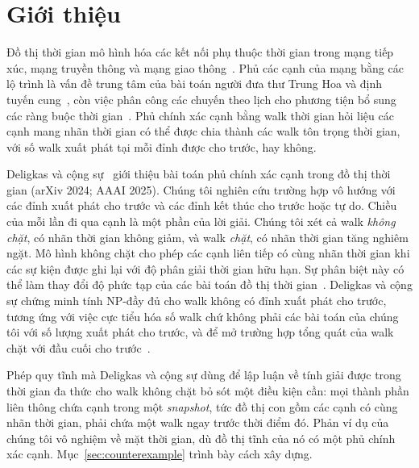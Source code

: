 \documentclass[pdflatex,sn-mathphys-num]{sn-jnl}
\theoremstyle{thmstyleone}%
\theoremstyle{thmstyletwo}%
\theoremstyle{thmstylethree}%
\begin{document}
\section{Giới thiệu}\label{sec:intro}

Đồ thị thời gian mô hình hóa các kết nối phụ thuộc thời gian trong mạng tiếp xúc, mạng truyền thông và mạng giao thông~\cite{kempe2002,holme2012,casteigts2012,michail2016}. Phủ các cạnh của mạng bằng các lộ trình là vấn đề trung tâm của bài toán người đưa thư Trung Hoa và định tuyến cung~\cite{edmonds1973,corberan2015}, còn việc phân công các chuyến theo lịch cho phương tiện bổ sung các ràng buộc thời gian~\cite{dantzig1954,bunte2009,kliewer2006}. Phủ chính xác cạnh bằng walk thời gian hỏi liệu các cạnh mang nhãn thời gian có thể được chia thành các walk tôn trọng thời gian, với số walk xuất phát tại mỗi đỉnh được cho trước, hay không.

Deligkas và cộng sự~\cite{deligkas2025} giới thiệu bài toán phủ chính xác cạnh trong đồ thị thời gian (arXiv 2024; AAAI 2025). Chúng tôi nghiên cứu trường hợp vô hướng với các đỉnh xuất phát cho trước và các đỉnh kết thúc cho trước hoặc tự do. Chiều của mỗi lần đi qua cạnh là một phần của lời giải. Chúng tôi xét cả walk \emph{không chặt}, có nhãn thời gian không giảm, và walk \emph{chặt}, có nhãn thời gian tăng nghiêm ngặt. Mô hình không chặt cho phép các cạnh liên tiếp có cùng nhãn thời gian khi các sự kiện được ghi lại với độ phân giải thời gian hữu hạn. Sự phân biệt này có thể làm thay đổi độ phức tạp của các bài toán đồ thị thời gian~\cite{casteigts2024}. Deligkas và cộng sự chứng minh tính NP-đầy đủ cho walk không có đỉnh xuất phát cho trước, tương ứng với việc cực tiểu hóa số walk chứ không phải các bài toán của chúng tôi với số lượng xuất phát cho trước, và để mở trường hợp tổng quát của walk chặt với đầu cuối cho trước~\cite{deligkas2025}.

Phép quy tĩnh mà Deligkas và cộng sự dùng để lập luận về tính giải được trong thời gian đa thức cho walk không chặt bỏ sót một điều kiện cần: mọi thành phần liên thông chứa cạnh trong một \emph{snapshot}, tức đồ thị con gồm các cạnh có cùng nhãn thời gian, phải chứa một walk ngay trước thời điểm đó. Phản ví dụ của chúng tôi vô nghiệm về mặt thời gian, dù đồ thị tĩnh của nó có một phủ chính xác cạnh. Mục~\ref{sec:counterexample} trình bày cách xây dựng.
\end{document}
